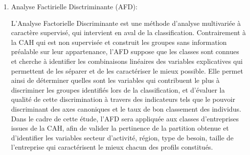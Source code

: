 \documentclass[12pt, a4paper, oneside]{report}
\begin{document}
\begin{enumerate}
	
	\paragraph{Formalisation mathématiques}
	Soit un ensemble de $n$ individus\\ $\Omega = \{\omega_1, \omega_2,
	\ldots, \omega_n\}$, décrits dans un espace factoriel de dimension $q$
	par leurs coordonnées issues de l'ACM. L'objectif de la CAH est de
	construire une partition de $\Omega$ en $K$ classes homogènes, en
	regroupant de manière itérative les individus les plus proches au sens
	d'une mesure de dissimilarité.
	
	La dissimilarité entre deux individus $\omega_i$ et $\omega_j$ est
	mesurée par la distance euclidienne dans l'espace factoriel~:
	
	\begin{equation}
		d(\omega_i, \omega_j) =
		\sqrt{\sum_{s=1}^{q} \left(F_{is} - F_{js}\right)^2}
		\label{eq:distance_euclidienne}
	\end{equation}
	
	La méthode de Ward est retenue comme critère d'agrégation. Elle repose
	sur la minimisation de la perte d'inertie inter-classes lors de chaque
	fusion. Soient $C_a$ et $C_b$ deux classes de cardinalités respectives
	$n_a$ et $n_b$, de centres de gravité $\bar{x}_a$ et $\bar{x}_b$.
	L'écart de Ward entre $C_a$ et $C_b$ est défini par~:
	
	\begin{equation}
		\Delta(C_a, C_b) = \frac{n_a \cdot n_b}{n_a + n_b}
		\left\| \bar{x}_a - \bar{x}_b \right\|^2
		\label{eq:ward}
	\end{equation}
	
	À chaque étape de l'algorithme, les deux classes $C_a$ et $C_b$
	minimisant $\Delta(C_a, C_b)$ sont fusionnées en une classe
	$C_{ab} = C_a \cup C_b$.
	
	
	\item Analyse Factirielle Disctriminante (AFD):
	
	L'Analyse Factorielle Discriminante est une méthode d'analyse multivariée à caractère supervisé, qui intervient en aval de la classification. Contrairement à la CAH qui est non supervisée et construit les groupes sans information préalable sur leur appartenance, l'AFD suppose que les classes sont connues et cherche à identifier les combinaisons linéaires des variables explicatives qui permettent de les séparer et de les caractériser le mieux possible. Elle permet ainsi de déterminer quelles sont les variables qui contribuent le plus à discriminer les groupes identifiés lors de la classification, et d'évaluer la qualité de cette discrimination à travers des indicateurs tels que le pouvoir discriminant des axes canoniques et le taux de bon classement des individus. Dans le cadre de cette étude, l'AFD sera appliquée aux classes d'entreprises issues de la CAH, afin de valider la pertinence de la partition obtenue et d'identifier les variables secteur d'activité, région, type de besoin, taille de l'entreprise qui caractérisent le mieux chacun des profils constitués.
	\end{enumerate}
	
\end{document}
